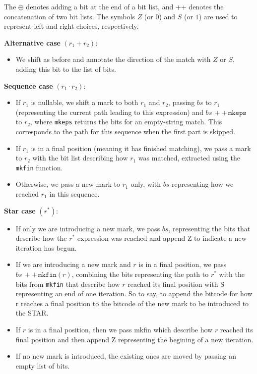 \documentclass[12pt]{article}
\begin{document}
The  $\oplus$ denotes adding a bit at the end of a bit list, and ++ denotes the concatenation of two bit lists. 
The symbols $Z$ (or $0$) and $S$ (or $1$) are used to represent left and right choices, respectively.

\textbf{Alternative case} $(r_1 + r_2)$: 
\begin{itemize}
  \item We shift as before and annotate the direction of the match with $Z$ or $S$, adding this bit to the list of bits.
\end{itemize}

\textbf{Sequence case} $(r_1 \cdot r_2)$:
\begin{itemize}
    \item If $r_1$ is nullable, we shift a mark to both $r_1$ and $r_2$, passing $bs$ to $r_1$ (representing the current 
    path leading to this expression) and $bs \, ++ \, \texttt{mkeps}$ to $r_2$, where \texttt{mkeps} returns the bits for 
    an empty-string match. This corresponds to the path for this sequence when the first part is skipped.
    \item If $r_1$ is in a final position (meaning it has finished matching), we pass a mark to $r_2$ with the bit list 
    describing how $r_1$ was matched, extracted using the \texttt{mkfin} function.
    \item Otherwise, we pass a new mark to $r_1$ only, with $bs$ representing how we reached $r_1$ in this sequence.
\end{itemize}

\textbf{Star case} $(r^*)$:
\begin{itemize}
    \item If only we are introducing a new mark, we pass $bs$, representing the bits that describe how the $r^*$ expression
     was reached and append Z to indicate a new iteration has begun.
    \item If we are introducing a new mark and $r$ is in a final position, we pass $bs \, ++ \, \texttt{mkfin}(r)$, combining
     the bits representing the path to $r^*$ with the bits from 
    \texttt{mkfin} that describe how $r$ reached its final position with S representing an end of one iteration. So to say, 
    to append the bitcode for how r reaches a final position to the bitcode of the new mark to be introduced to the STAR.
    \item If $r$ is in a final position, then we pass mkfin which describe how $r$ reached its final position and then append
     Z representing the begining of a new iteration.
    \item If no new mark is introduced, the existing ones are moved by passing an empty list of bits.
\end{itemize}
\end{document}
